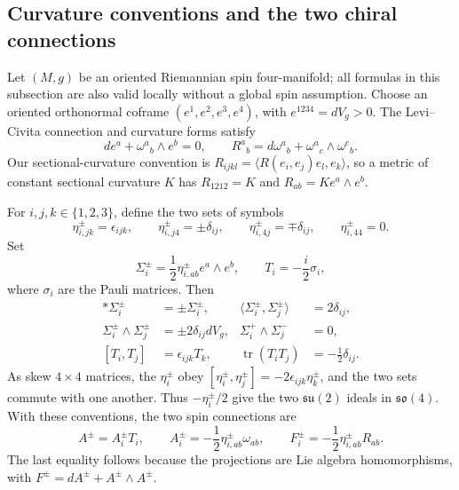 \documentclass[11pt]{article}
\numberwithin{equation}{section}
\theoremstyle{definition}
\theoremstyle{remark}
\begin{document}
\subsection{Curvature conventions and the two chiral connections}
\label{subsec:round-conventions}

Let $(M,g)$ be an oriented Riemannian spin four-manifold; all formulas in this
subsection are also valid locally without a global spin assumption.  Choose
an oriented orthonormal coframe $(e^1,e^2,e^3,e^4)$, with
$e^{1234}=dV_g>0$.  The Levi--Civita connection and curvature forms satisfy
\begin{equation}
 de^a+\omega^a{}_b\wedge e^b=0,
 \qquad R^a{}_b=d\omega^a{}_b+\omega^a{}_c\wedge\omega^c{}_b.
 \label{eq:round-cartan-conventions}
\end{equation}
Our sectional-curvature convention is
$R_{ijkl}=\langle R(e_i,e_j)e_l,e_k\rangle$, so a metric of constant
sectional curvature $K$ has $R_{1212}=K$ and
$R_{ab}=K e^a\wedge e^b$.

For $i,j,k\in\{1,2,3\}$, define the two sets of symbols
\begin{equation}
 \eta^\pm_{i,jk}=\epsilon_{ijk},\qquad
 \eta^\pm_{i,j4}=\pm\delta_{ij},\qquad
 \eta^\pm_{i,4j}=\mp\delta_{ij},\qquad
 \eta^\pm_{i,44}=0.
 \label{eq:round-eta}
\end{equation}
Set
\begin{equation}
 \Sigma_i^\pm=\frac12\eta^\pm_{i,ab}e^a\wedge e^b,
 \qquad T_i=-\frac{i}{2}\sigma_i,
 \label{eq:round-sigma-generators}
\end{equation}
where $\sigma_i$ are the Pauli matrices.  Then
\begin{align}
 *\Sigma_i^\pm&=\pm\Sigma_i^\pm,
 &\langle\Sigma_i^\pm,\Sigma_j^\pm\rangle&=2\delta_{ij},
 \label{eq:round-sigma-norms}\\
 \Sigma_i^\pm\wedge\Sigma_j^\pm&=\pm2\delta_{ij}dV_g,
 &\Sigma_i^+\wedge\Sigma_j^-&=0,
 \label{eq:round-sigma-wedges}\\
 [T_i,T_j]&=\epsilon_{ijk}T_k,
 &\operatorname{tr}(T_iT_j)&=-\frac12\delta_{ij}.
 \label{eq:round-generator-norms}
\end{align}
As skew $4\times4$ matrices, the $\eta_i^\pm$ obey
$[\eta_i^\pm,\eta_j^\pm]=-2\epsilon_{ijk}\eta_k^\pm$, and the two
sets commute with one another.  Thus $-\eta_i^\pm/2$ give the two
$\mathfrak{su}(2)$ ideals in $\mathfrak{so}(4)$.  With these conventions,
the two spin connections are
\begin{equation}
 A^\pm=A_i^\pm T_i,\qquad
 A_i^\pm=-\frac12\eta^\pm_{i,ab}\omega_{ab},\qquad
 F_i^\pm=-\frac12\eta^\pm_{i,ab}R_{ab}.
 \label{eq:round-spin-projection}
\end{equation}
The last equality follows because the projections are Lie algebra
homomorphisms, with $F^\pm=dA^\pm+A^\pm\wedge A^\pm$.
\end{document}
